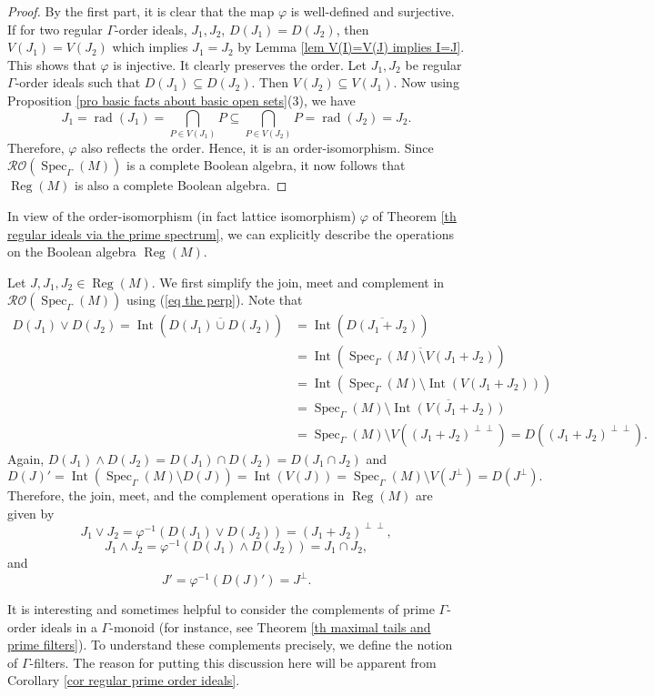 \documentclass[a4paper,reqno,12pt]{amsart}
\numberwithin{equation}{section}
\theoremstyle{definition}
\theoremstyle{remark}
\newcommand{\rad}{\operatorname{rad}}
\newcommand{\Spec}{\operatorname{Spec}}
\newcommand{\Int}{\operatorname{Int}}
\newcommand{\reg}{\operatorname{Reg}}
\begin{document}
\begin{proof}
By the first part, it is clear that the map $\varphi$ is well-defined and surjective. If for two regular $\Gamma$-order ideals, $J_1,J_2$, $D(J_1)=D(J_2)$, then $V(J_1)=V(J_2)$ which implies $J_1=J_2$ by Lemma \ref{lem V(I)=V(J) implies I=J}. This shows that $\varphi$ is injective. It clearly preserves the order. Let $J_1,J_2$ be regular $\Gamma$-order ideals such that $D(J_1)\subseteq D(J_2)$. Then $V(J_2)\subseteq V(J_1)$. Now using Proposition \ref{pro basic facts about basic open sets}(3), we have \[J_1=\rad(J_1)=\displaystyle{\bigcap_{P\in V(J_1)}}P\subseteq \displaystyle{\bigcap_{P\in V(J_2)}}P=\rad(J_2)=J_2.\] Therefore, $\varphi$ also reflects the order. Hence, it is an order-isomorphism. Since $\mathcal{R}\mathcal{O}(\Spec_\Gamma(M))$ is a complete Boolean algebra, it now follows that $\reg(M)$ is also a complete Boolean algebra. 
\end{proof}
In view of the order-isomorphism (in fact lattice isomorphism) $\varphi$ of Theorem \ref{th regular ideals via the prime spectrum}, we can explicitly describe the operations on the Boolean algebra $\reg(M)$. 

Let $J,J_1,J_2\in \reg(M)$. We first simplify the join, meet and complement in $\mathcal{R}\mathcal{O}(\Spec_\Gamma(M))$ using (\ref{eq the perp}). Note that 
\begin{align*}
D(J_1)\vee D(J_2)=\Int(\overline{D(J_1)\cup D(J_2)})&=\Int(\overline{D(J_1+J_2)})\\
&=\Int\left(\overline{\Spec_\Gamma(M)\setminus V(J_1+J_2)}\right)\\
&=\Int\left(\Spec_\Gamma(M)\setminus \Int(V(J_1+J_2))\right)\\
&=\Spec_\Gamma(M)\setminus \overline{\Int(V(J_1+J_2))}\\
&=\Spec_\Gamma(M)\setminus V\left((J_1+J_2)^{\perp\perp}\right)=D\left((J_1+J_2)^{\perp\perp}\right).
\end{align*}
Again, $D(J_1)\wedge D(J_2)=D(J_1)\cap D(J_2)=D(J_1\cap J_2)$ and \[D(J)'=\Int(\Spec_\Gamma(M)\setminus D(J))=\Int(V(J))=\Spec_\Gamma(M)\setminus V(J^\perp)=D(J^\perp).\] Therefore, the join, meet, and the complement operations in $\reg(M)$ are given by \[J_1\vee J_2=\varphi^{-1}\left(D(J_1)\vee D(J_2)\right)=(J_1+J_2)^{\perp\perp},\] \[J_1\wedge J_2=\varphi^{-1}\left(D(J_1)\wedge D(J_2)\right)=J_1\cap J_2,\] and \[J'=\varphi^{-1}\left(D(J)'\right)=J^\perp.\] 

It is interesting and sometimes helpful to consider the complements of prime $\Gamma$-order ideals in a $\Gamma$-monoid (for instance, see Theorem \ref{th maximal tails and prime filters}). To understand these complements precisely, we define the notion of $\Gamma$-filters. The reason for putting this discussion here will be apparent from Corollary \ref{cor regular prime order ideals}.  
\end{document}
